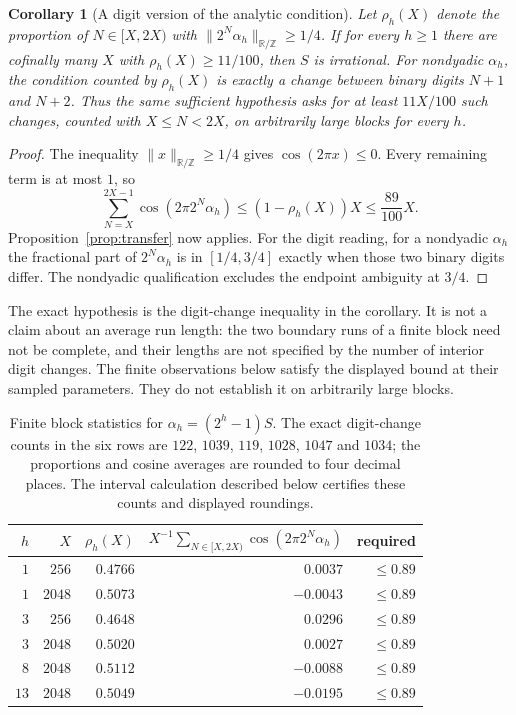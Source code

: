 \documentclass[11pt]{article}
\theoremstyle{plain}
\newtheorem{cor}[thm]{Corollary}
\theoremstyle{definition}
\theoremstyle{remark}
\newcommand{\Z}{\mathbb{Z}}
\newcommand{\R}{\mathbb{R}}
\begin{document}
\begin{cor}[A digit version of the analytic condition]\label{cor:digitform}
Let $\rho_h(X)$ denote the proportion of $N\in[X,2X)$ with
$\|2^N\alpha_h\|_{\R/\Z}\ge 1/4$. If for every $h\ge 1$ there are cofinally
many $X$ with $\rho_h(X)\ge 11/100$, then $S$ is irrational.
For nondyadic $\alpha_h$, the condition counted by $\rho_h(X)$ is
exactly a change between binary digits $N+1$ and $N+2$. Thus the same
sufficient hypothesis asks for at least $11X/100$ such changes, counted
with $X\le N<2X$, on arbitrarily large blocks for every $h$.
\end{cor}

\begin{proof}
The inequality $\|x\|_{\R/\Z}\ge1/4$ gives $\cos(2\pi x)\le0$.
Every remaining term is at most $1$, so
\[
 \sum_{N=X}^{2X-1}\cos(2\pi 2^N\alpha_h)
          \le(1-\rho_h(X))X\le\frac{89}{100}X.
\]
Proposition~\ref{prop:transfer} now applies. For the digit
reading, for a nondyadic $\alpha_h$ the fractional part of $2^N\alpha_h$
is in $[1/4,3/4]$ exactly when those two binary digits differ.
The nondyadic qualification excludes the endpoint ambiguity at $3/4$.
\end{proof}

\noindent
The exact hypothesis is the digit-change inequality in the
corollary. It is not a claim about an average run length: the two boundary
runs of a finite block need not be complete, and their lengths are not
specified by the number of interior digit changes.
The finite observations below satisfy the displayed bound at their sampled
parameters. They do not establish it on arbitrarily large blocks.


\begin{table}[h]\centering
\begin{tabular}{r r r r r}
\hline
$h$ & $X$ & $\rho_h(X)$ & $X^{-1}\sum_{N\in[X,2X)}\cos(2\pi 2^N\alpha_h)$ & required \\
\hline
$1$ & $256$  & $0.4766$ & $\phantom{-}0.0037$ & $\le 0.89$ \\
$1$ & $2048$ & $0.5073$ & $-0.0043$ & $\le 0.89$ \\
$3$ & $256$  & $0.4648$ & $\phantom{-}0.0296$ & $\le 0.89$ \\
$3$ & $2048$ & $0.5020$ & $\phantom{-}0.0027$ & $\le 0.89$ \\
$8$ & $2048$ & $0.5112$ & $-0.0088$ & $\le 0.89$ \\
$13$& $2048$ & $0.5049$ & $-0.0195$ & $\le 0.89$ \\
\hline
\end{tabular}
\caption{Finite block statistics for $\alpha_h=(2^h-1)S$.
The exact digit-change counts in the six rows are $122$, $1039$, $119$,
$1028$, $1047$ and $1034$; the proportions and cosine averages are
rounded to four decimal places. The interval calculation described
below certifies these counts and displayed roundings.}
\label{tab:blocks}
\end{table}
\end{document}
